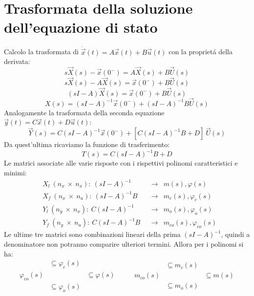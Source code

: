 \documentclass[../main.tex]{subfiles}
\begin{document}
	\section{Trasformata della soluzione dell'equazione di stato}
		Calcolo la trasformata di $ \dot{\vec x}(t) = A \vec x(t) + B \vec u(t) $ con la propriet\'a della derivata:
		\[
			s \vec X(s) - \vec x(0^-) = A \vec X(s) + B \vec U(s)
		\]
		\[
			s \vec X(s) - A \vec X(s) = \vec x(0^-) + B \vec U(s)
		\]
		\[
			(sI - A) \vec X(s) = \vec x(0^-) + B \vec U(s)
		\]
		\begin{equation}
			X(s) = (sI-A)^{-1} \vec x(0^-) + (sI-A)^{-1} B \vec U(s)
		\end{equation}
		Analogamente la trasformata della seconda equazione $ \vec y(t) = C \vec x(t) + D \vec u(t) $:
		\begin{equation}
			\vec Y(s) = C (sI-A)^{-1} \vec x(0^-) + [C(sI-A)^{-1}B + D]\ \vec U(s)
		\end{equation}
		Da quest'ultima ricaviamo la funzione di trasferimento:
		\[
			T(s) = C (sI-A)^{-1} B + D
		\]
		Le matrici associate alle varie risposte con i rispettivi polinomi caratteristici e minimi:
		\begin{align*}
			&X_l\ (n_x\ \times\ n_x):\ (sI-A)^{-1} &&\longrightarrow &m(s), \varphi(s)
			\\
			&X_f\ (n_x\ \times\ n_u):\ (sI-A)^{-1}B &&\longrightarrow &m_c(s), \varphi_c(s)
			\\
			&Y_l\ (n_y\ \times\ n_x):\ C(sI-A)^{-1} &&\longrightarrow &m_o(s), \varphi_o(s)
			\\
			&Y_f\ (n_y\ \times\ n_u):\ C(sI-A)^{-1}B &&\longrightarrow &m_{co}(s), \varphi_{co}(s)
		\end{align*}
		Le ultime tre matrici sono combinazioni lineari della prima $ (sI-A)^{-1} $, quindi a denominatore non potranno comparire ulteriori termini. Allora per i polinomi si ha:
		\[ 
			\begin{array}{ccc}
								&\subseteq \varphi_c(s) &\\
				\varphi_{co}(s)	& 					  	&\subseteq \varphi(s)\\
								&\subseteq \varphi_o(s) &\\
			\end{array} \qquad
			\begin{array}{ccc}
						  &\subseteq m_c(s) &\\
				m_{co}(s) & 				&\subseteq m(s)\\
						  &\subseteq m_o(s) &\\
			\end{array}
		\]
		
\end{document}
